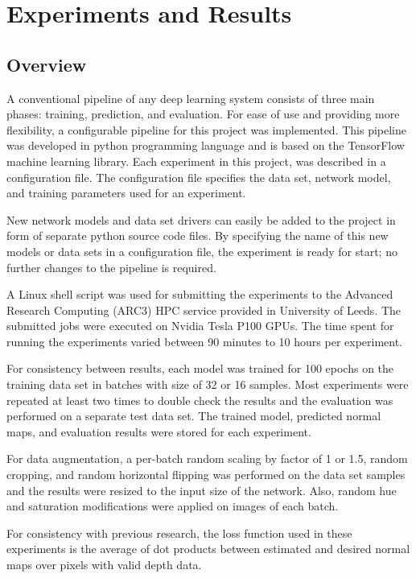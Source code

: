 \chapter{Experiments and Results}
\label{ExperimentsAndResults}

\section{Overview}

A conventional pipeline of any deep learning system consists of three main phases: training, prediction, and evaluation. For ease of use and providing more flexibility, a configurable pipeline for this project was implemented. This pipeline was developed in python programming language and is based on the TensorFlow machine learning library. Each experiment in this project, was described in a configuration file. The configuration file specifies the data set, network model, and training parameters used for an experiment. 

New network models and data set drivers can easily be added to the project in form of separate python source code files. By specifying the name of this new models or data sets in a configuration file, the experiment is ready for start; no further changes to the pipeline is required. 

A Linux shell script was used for submitting the experiments to the Advanced Research Computing (ARC3) HPC service provided in University of Leeds. The submitted jobs were executed on Nvidia Tesla P100 GPUs. The time spent for running the experiments varied between 90 minutes to 10 hours per experiment. 

For consistency between results, each model was trained for 100 epochs on the training data set in batches with size of 32 or 16 samples. Most experiments were repeated at least two times to double check the results and the evaluation was performed on a separate test data set. The trained model, predicted normal maps, and evaluation results were stored for each experiment. 

For data augmentation, a per-batch random scaling by factor of 1 or 1.5, random cropping, and random horizontal flipping was performed on the data set samples and the results were resized to the input size of the network. Also, random hue and saturation modifications were applied on images of each batch.   

For consistency with previous research, the loss function used in these experiments is the average of dot products between estimated and desired normal maps over pixels with valid depth data. 


